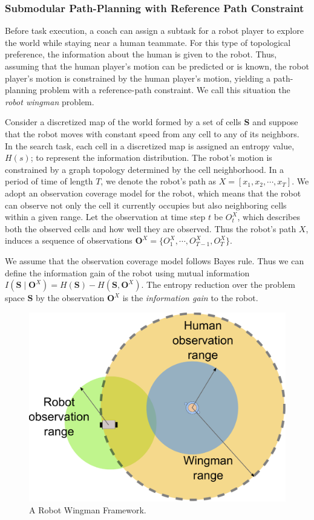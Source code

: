 \documentclass[phd]{byuprop}
\begin{document}
\subsubsection{Submodular Path-Planning with Reference Path Constraint}
\label{sec:project_description:submodular_path_planning_with_reference_path_constraint}

Before task execution, a coach can assign a subtask for a robot player to explore the world while staying near a human teammate.
For this type of topological preference, the information about the human is given to the robot.
Thus, assuming that the human player's motion can be predicted or is known, the robot player's motion is constrained by the human player's motion, yielding a path-planning problem with a reference-path constraint.
We call this situation the {\em robot wingman} problem.

Consider a discretized map of the world formed by a set of cells $ \mathbf{S}$ and suppose that the robot moves with constant speed from any cell to any of its neighbors.
In the search task, each cell in a discretized map is assigned an entropy value, $ H(s) $; to represent the information distribution.
The robot's motion is constrained by a graph topology determined by the cell neighborhood. 
In a period of time of length $ T $, we denote the robot's path as $ X = [x_{1}, x_{2} , \cdots , x_{T}] $.
We adopt an observation coverage model for the robot, which means that the robot can observe not only the cell it currently occupies but also neighboring cells within a given range.
Let the observation at time step $ t $ be $ O^{X}_{t} $, which describes both the observed cells and how well they are observed.
Thus the robot's path $X$, induces a sequence of observations $ \mathbf{O}^{X} = \{ O^{X}_{1}, \cdots , O^{X}_{T-1}, O^{X}_{T} \}$.

We assume that the observation coverage model follows Bayes rule.
Thus we can define the information gain of the robot using mutual information $ I( \mathbf{S} \mid \mathbf{O}^{X} ) =  H( \mathbf{S} ) - H( \mathbf{S}, \mathbf{O}^{X}  ) $.
The entropy reduction over the problem space $ \mathbf{S} $ by the observation $ \mathbf{O}^{X} $ is the {\em information gain} to the robot.

\begin{figure}[hbtp]
\centering
\includegraphics[width=0.37\linewidth]{./fig/Wingman.pdf}
\caption{A Robot Wingman Framework.}
\label{fig:Wingman}
\end{figure}
\end{document}
